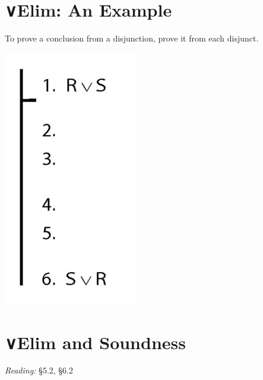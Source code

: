 \documentclass[12pt]{extarticle}
\begin{document}
\begin{multicols*}{3}
 
\section{∨Elim: An Example}
 
To prove a conclusion from a disjunction, prove it from each disjunct.
 
\begin{center}
\includegraphics[scale=0.3]{img/proof_disjunction_elim.png}
\end{center}
 
 
\section{∨Elim and Soundness}
 
\emph{Reading:} §5.2, §6.2
 
\vfill


 


\end{multicols*}
\end{document}
